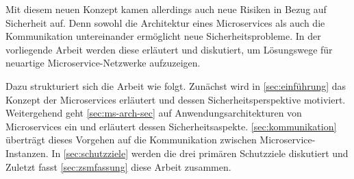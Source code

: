 \documentclass[12pt]{article}
\begin{document}
Mit diesem neuen Konzept kamen allerdings auch neue Risiken in Bezug auf Sicherheit auf. Denn sowohl die Architektur eines Microservices als auch die Kommunikation untereinander ermöglicht neue Sicherheitsprobleme. In der vorliegende Arbeit werden diese erläutert und diskutiert, um Lösungswege für neuartige Microservice-Netzwerke aufzuzeigen.

Dazu strukturiert sich die Arbeit wie folgt. Zunächst wird in \autoref{sec:einführung} das Konzept der Microservices erläutert und dessen Sicherheitsperspektive motiviert. Weitergehend geht \autoref{sec:ms-arch-sec} auf Anwendungsarchitekturen von Microservices ein und erläutert dessen Sicherheitsaspekte. \autoref{sec:kommunikation} überträgt dieses Vorgehen auf die Kommunikation zwischen Microservice-Instanzen. In \autoref{sec:schutzziele} werden die drei primären Schutzziele diskutiert und  Zuletzt fasst \autoref{sec:zsmfassung} diese Arbeit zusammen.








\nocite{*}


\end{document}
